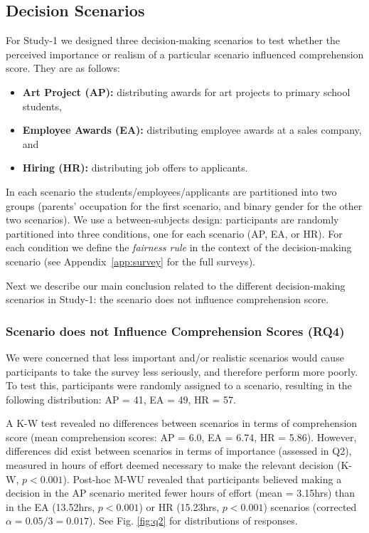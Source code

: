 \documentclass{article}
\newcommand{\studyA}{Study-1}
\begin{document}
 
\subsection{Decision Scenarios} \label{app:scenario_analysis}

For \studyA{} we designed three decision-making scenarios to test whether the perceived importance or realism of a particular scenario influenced comprehension score. They are as follows:
\begin{itemize} \itemsep=0cm
    \item \textbf{Art Project (AP):} distributing awards for art projects to primary school students,
    \item \textbf{Employee Awards (EA):} distributing employee awards at a sales company, and
    \item \textbf{Hiring (HR):} distributing job offers to applicants.
\end{itemize}
In each scenario the students/employees/applicants are partitioned into two groups (parents' occupation for the first scenario, and binary gender for the other two scenarios).
We use a between-subjects design: participants are randomly partitioned into three conditions, one for each scenario (AP, EA, or HR).
For each condition we define the \emph{fairness rule} in the context of the decision-making scenario (see Appendix~\ref{app:survey} for the full surveys).

Next we describe our main conclusion related to the different decision-making scenarios in \studyA: the scenario does not influence comprehension score.


\subsubsection{Scenario does not Influence Comprehension Scores (RQ4)} \label{results:rq4}

We were concerned that less important and/or realistic scenarios would cause participants to take the survey less seriously, and therefore perform more poorly.
To test this,
participants were randomly assigned to a scenario, resulting in the following distribution: AP = 41, EA = 49, HR = 57.

A K-W test revealed no differences between scenarios in terms of comprehension score (mean comprehension scores: AP = 6.0, EA = 6.74, HR = 5.86). However, differences did exist between scenarios in terms of importance (assessed in Q2), measured in hours of effort deemed necessary to make the relevant decision (K-W, $p<0.001$). Post-hoc M-WU revealed that participants believed making a decision in the AP scenario merited fewer hours of effort (mean = 3.15hrs) than in the EA (13.52hrs, $p<0.001$)
or HR (15.23hrs, $p<0.001$)
scenarios (corrected $\alpha=0.05/3=0.017$). See Fig. \ref{fig:q2} for distributions of responses.
\end{document}
